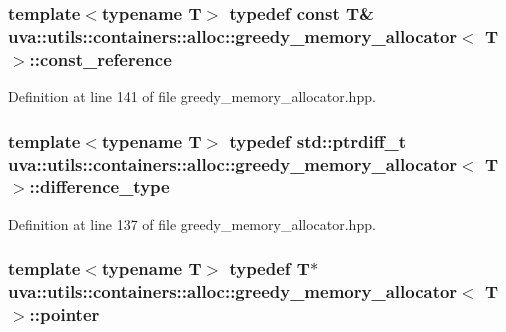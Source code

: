 \subsubsection[{const\+\_\+reference}]{\setlength{\rightskip}{0pt plus 5cm}template$<$typename T$>$ typedef const T\& {\bf uva\+::utils\+::containers\+::alloc\+::greedy\+\_\+memory\+\_\+allocator}$<$ T $>$\+::{\bf const\+\_\+reference}}\label{classuva_1_1utils_1_1containers_1_1alloc_1_1greedy__memory__allocator_aaff0778ffef1cc6b18f8135ec663fe14}


Definition at line 141 of file greedy\+\_\+memory\+\_\+allocator.\+hpp.

\hypertarget{classuva_1_1utils_1_1containers_1_1alloc_1_1greedy__memory__allocator_ad87f3eb0265e42524ed5c4d1d8cff6b7}{}
\subsubsection[{difference\+\_\+type}]{\setlength{\rightskip}{0pt plus 5cm}template$<$typename T$>$ typedef std\+::ptrdiff\+\_\+t {\bf uva\+::utils\+::containers\+::alloc\+::greedy\+\_\+memory\+\_\+allocator}$<$ T $>$\+::{\bf difference\+\_\+type}}\label{classuva_1_1utils_1_1containers_1_1alloc_1_1greedy__memory__allocator_ad87f3eb0265e42524ed5c4d1d8cff6b7}


Definition at line 137 of file greedy\+\_\+memory\+\_\+allocator.\+hpp.

\hypertarget{classuva_1_1utils_1_1containers_1_1alloc_1_1greedy__memory__allocator_a94dedfba2d38dbe2bec50f6eb95b98eb}{}
\subsubsection[{pointer}]{\setlength{\rightskip}{0pt plus 5cm}template$<$typename T$>$ typedef T$\ast$ {\bf uva\+::utils\+::containers\+::alloc\+::greedy\+\_\+memory\+\_\+allocator}$<$ T $>$\+::{\bf pointer}}\label{classuva_1_1utils_1_1containers_1_1alloc_1_1greedy__memory__allocator_a94dedfba2d38dbe2bec50f6eb95b98eb}


